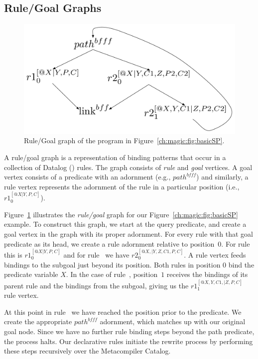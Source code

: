 \subsection{Rule/Goal Graphs}

\begin{figure}
\begin{center}
\includegraphics[scale=0.5]{figures/RuleGoalGraph}
\caption{\label{ch:magic:fig:rggraph}Rule/Goal graph of the program in Figure~\ref{ch:magic:fig:basicSP}.}
\end{center}
\end{figure}

A rule/goal graph is a representation of binding patterns that occur in a
collection of Datalog (\OVERLOG) rules.  The graph consists of {\em rule} and
{\em goal} vertices.  A goal vertex consists of a predicate with an adornment
(e.g., $path^{bfff}$) and similarly, a rule vertex represents the adornment of
the rule in a particular position (i.e., $r1_0^{[@X|Y,P,C]}$).

Figure~\ref{ch:magic:fig:rggraph} illustrates the {\em rule/goal} graph for our
Figure~\ref{ch:magic:fig:basicSP} example.  To construct this graph, we start
at the query predicate, and create a goal vertex in the graph with its proper
adornment.  For every rule with that goal predicate as its head, we create a
rule adornment relative to position~$0$.  For rule~ this is
$r1_0^{[@X|Y,P,C]}$ and for rule~ we have $r2_0^{[@X,|Y,Z,C1,P,C]}$.  A
rule vertex feeds bindings to the subgoal just beyond its position.  Both rules
in position $0$ bind the  predicate variable $X$.  In the case of
rule~, position~$1$ receives the bindings of its parent rule and
the bindings from the  subgoal, giving us the
$r1_1^{[@X,Y,C1,|Z,P,C]}$ rule vertex.

At this point in rule~ we have reached the position prior to the
 predicate.  We create the appropriate $path^{bfff}$ adornment, which
matches up with our original  goal node.  Since we have no further
rule binding steps beyond the path predicate, the process halts.  Our
declarative rules initiate the rewrite process by performing these steps
recursively over the Metacompiler Catalog.

